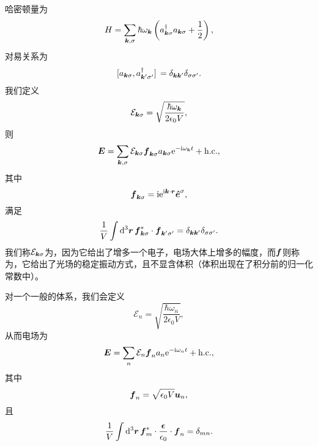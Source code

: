 哈密顿量为
\begin{equation}
    H = \sum_{\vb*{k}, \sigma} \hbar \omega_{\vb*{k}} \left( a^\dagger_{\vb*{k} \sigma} a_{\vb*{k} \sigma} + \frac{1}{2} \right),
\end{equation}
对易关系为
\begin{equation}
    \comm*{a_{\vb*{k} \sigma}}{a_{\vb*{k}' \sigma'}^\dagger} = \delta_{\vb*{k} \vb*{k}'} \delta_{\sigma \sigma'}.
\end{equation}
我们定义
\begin{equation}
    \mathcal{E}_{\vb*{k} \sigma} = \sqrt{\frac{\hbar \omega_{\vb*{k}}}{2 \epsilon_0 V}},
\end{equation}
则
\begin{equation}
    \vb*{E} = \sum_{\vb*{k}, \sigma} \mathcal{E}_{\vb*{k} \sigma} \vb*{f}_{\vb*{k} \sigma} a_{\vb*{k} \sigma} \mathrm{e}^{- \mathrm{i} \omega_{\vb*{k}} t} + \text{h.c.},
\end{equation}
其中
\begin{equation}
    \vb*{f}_{\vb*{k} \sigma} = \mathrm{i} \mathrm{e}^{\mathrm{i} \vb*{k} \cdot \vb*{r}} \vu*{e}^\sigma,
\end{equation}
满足
\begin{equation}
    \frac{1}{V} \int \dd[3]{\vb*{r}} \vb*{f}^*_{\vb*{k} \sigma} \cdot \vb*{f}_{\vb*{k}' \sigma'} = \delta_{\vb*{k} \vb*{k}'} \delta_{\sigma \sigma'}.
\end{equation}
我们称$\mathcal{E}_{\vb*{k} \sigma}$为，因为它给出了增多一个电子，电场大体上增多的幅度，而$\vb*{f}$则称为，它给出了光场的稳定振动方式，且不显含体积（体积出现在了积分前的归一化常数中）。

对一个一般的体系，我们会定义
\begin{equation}
    \mathcal{E}_{n} = \sqrt{\frac{\hbar \omega_n}{2 \epsilon_0 V}},
\end{equation}
从而电场为
\begin{equation}
    \vb*{E} = \sum_n \mathcal{E}_n \vb*{f}_{n} a_n \mathrm{e}^{- \mathrm{i} \omega_n t} + \text{h.c.},
    \label{eq:general-optical-field}
\end{equation}
其中
\begin{equation}
    \vb*{f}_n = \sqrt{\epsilon_0 V} \vb*{u}_n,
\end{equation}
且
\begin{equation}
    \frac{1}{V} \int \dd[3]{\vb*{r}} \vb*{f}_m^* \cdot \frac{\vb*{\epsilon}}{\epsilon_0} \cdot \vb*{f}_n = \delta_{mn}.
\end{equation}


